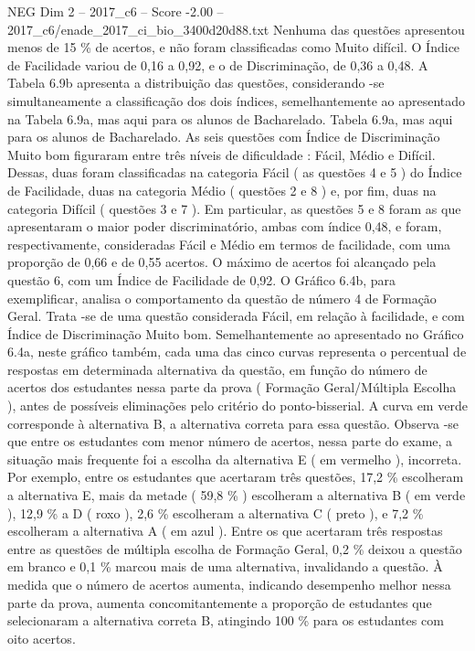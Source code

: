 \begin{textsample}{NEG Dim 2 – 2017\_c6 – Score -2.00 – 2017\_c6/enade\_2017\_ci\_bio\_3400d20d88.txt}
Nenhuma das questões apresentou menos de 15 \% de acertos, e não foram classificadas como Muito difícil.
O Índice de Facilidade variou de 0,16 a 0,92, e o de Discriminação, de 0,36 a 0,48.
A Tabela 6.9b apresenta a distribuição das questões, considerando -se simultaneamente a classificação dos dois índices, semelhantemente ao apresentado na Tabela 6.9a, mas aqui para os alunos de Bacharelado.
Tabela 6.9a, mas aqui para os alunos de Bacharelado.
As seis questões com Índice de Discriminação Muito bom figuraram entre três níveis de dificuldade : Fácil, Médio e Difícil.
Dessas, duas foram classificadas na categoria Fácil ( as questões 4 e 5 ) do Índice de Facilidade, duas na categoria Médio ( questões 2 e 8 ) e, por fim, duas na categoria Difícil ( questões 3 e 7 ).
Em particular, as questões 5 e 8 foram as que apresentaram o maior poder discriminatório, ambas com índice 0,48, e foram, respectivamente, consideradas Fácil e Médio em termos de facilidade, com uma proporção de 0,66 e de 0,55 acertos.
O máximo de acertos foi alcançado pela questão 6, com um Índice de Facilidade de 0,92.
O Gráfico 6.4b, para exemplificar, analisa o comportamento da questão de número 4 de Formação Geral.
Trata -se de uma questão considerada Fácil, em relação à facilidade, e com Índice de Discriminação Muito bom.
Semelhantemente ao apresentado no Gráfico 6.4a, neste gráfico também, cada uma das cinco curvas representa o percentual de respostas em determinada alternativa da questão, em função do número de acertos dos estudantes nessa parte da prova ( Formação Geral/Múltipla Escolha ), antes de possíveis eliminações pelo critério do ponto-bisserial.
A curva em verde corresponde à alternativa B, a alternativa correta para essa questão.
Observa -se que entre os estudantes com menor número de acertos, nessa parte do exame, a situação mais frequente foi a escolha da alternativa E ( em vermelho ), incorreta.
Por exemplo, entre os estudantes que acertaram três questões, 17,2 \% escolheram a alternativa E, mais da metade ( 59,8 \% ) escolheram a alternativa B ( em verde ), 12,9 \% a D ( roxo ), 2,6 \% escolheram a alternativa C ( preto ), e 7,2 \% escolheram a alternativa A ( em azul ).
Entre os que acertaram três respostas entre as questões de múltipla escolha de Formação Geral, 0,2 \% deixou a questão em branco e 0,1 \% marcou mais de uma alternativa, invalidando a questão.
À medida que o número de acertos aumenta, indicando desempenho melhor nessa parte da prova, aumenta concomitantemente a proporção de estudantes que selecionaram a alternativa correta B, atingindo 100 \% para os estudantes com oito acertos.

\end{textsample}
